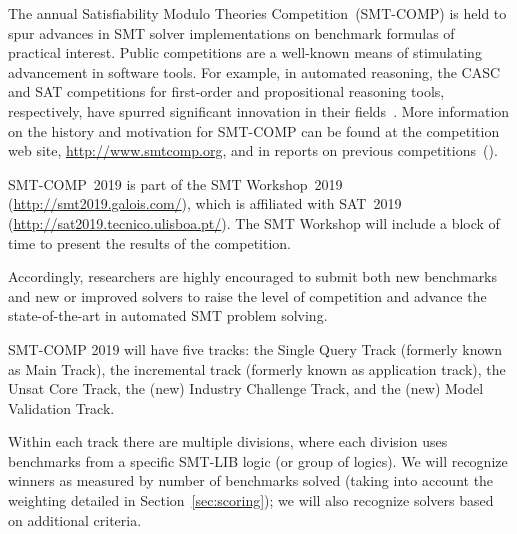 \documentclass[12pt]{article}
\newcommand{\main}{Single Query\xspace}
\newcommand{\ucore}{Unsat Core\xspace}
\newcommand{\mval}{Model Validation\xspace}
\newcommand{\challenge}{Industry Challenge\xspace}
\begin{document}
The annual Satisfiability Modulo Theories Competition~(SMT-COMP) is
held to spur advances in SMT solver implementations on benchmark
formulas of practical interest.  Public competitions are a well-known
means of stimulating advancement in software tools.  For example, in
automated reasoning, the CASC and SAT competitions for first-order and
propositional reasoning tools, respectively, have spurred significant
innovation in their fields~\cite{leberre+03,PSS02}.  More information
on the history and motivation for SMT-COMP can be found at the
competition web site, \url{http://www.smtcomp.org}, and in reports on
previous
competitions~(\cite{SMTCOMP-JAR,SMTCOMP-FMSD,BDOS08,SMTCOMP-2008,CDW14,SMTCOMP-2012,CSW15}).

SMT-COMP~2019 is part of the SMT Workshop~2019
(\url{http://smt2019.galois.com/}),
which is affiliated with SAT~2019 (\url{http://sat2019.tecnico.ulisboa.pt/}).
The SMT Workshop will include a block of time to present the results of the
competition.

Accordingly, researchers are highly encouraged to submit both new
benchmarks and new or improved solvers to raise the level of
competition and advance the state-of-the-art in automated SMT problem
solving.

SMT-COMP 2019 will have five tracks: the \main Track (formerly known
as Main Track), the incremental track (formerly known as application
track), the \ucore Track, the (new) \challenge Track, and the (new)
\mval Track.

Within each track there are multiple divisions, where each division
uses benchmarks from a specific SMT-LIB logic (or group of logics).
We will recognize winners as measured by number of benchmarks solved
(taking into account the weighting detailed in
Section~\ref{sec:scoring}); we will also recognize solvers based on
additional criteria.
\end{document}
